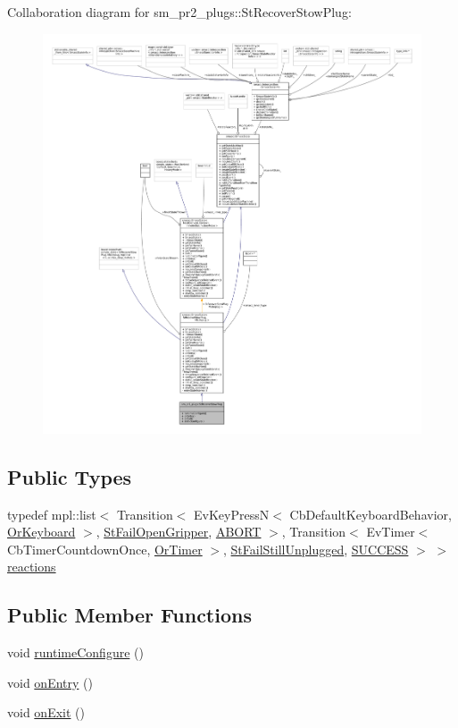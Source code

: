 Collaboration diagram for sm\+\_\+pr2\+\_\+plugs\+:\+:St\+Recover\+Stow\+Plug\+:
\nopagebreak
\begin{figure}[H]
\begin{center}
\leavevmode
\includegraphics[width=350pt]{structsm__pr2__plugs_1_1StRecoverStowPlug__coll__graph}
\end{center}
\end{figure}
\subsection*{Public Types}
\begin{DoxyCompactItemize}
\item 
typedef mpl\+::list$<$ Transition$<$ Ev\+Key\+PressN$<$ Cb\+Default\+Keyboard\+Behavior, \hyperlink{classsm__pr2__plugs_1_1OrKeyboard}{Or\+Keyboard} $>$, \hyperlink{structsm__pr2__plugs_1_1StFailOpenGripper}{St\+Fail\+Open\+Gripper}, \hyperlink{classABORT}{A\+B\+O\+RT} $>$, Transition$<$ Ev\+Timer$<$ Cb\+Timer\+Countdown\+Once, \hyperlink{classsm__pr2__plugs_1_1OrTimer}{Or\+Timer} $>$, \hyperlink{structsm__pr2__plugs_1_1StFailStillUnplugged}{St\+Fail\+Still\+Unplugged}, \hyperlink{classSUCCESS}{S\+U\+C\+C\+E\+SS} $>$ $>$ \hyperlink{structsm__pr2__plugs_1_1StRecoverStowPlug_a44331b5028d908b5a20054cc2ddb1972}{reactions}
\end{DoxyCompactItemize}
\subsection*{Public Member Functions}
\begin{DoxyCompactItemize}
\item 
void \hyperlink{structsm__pr2__plugs_1_1StRecoverStowPlug_a5f2f825961ceda59ed4811aaca86bbcf}{runtime\+Configure} ()
\item 
void \hyperlink{structsm__pr2__plugs_1_1StRecoverStowPlug_a0ce711a64e8d97a987222022ca226a40}{on\+Entry} ()
\item 
void \hyperlink{structsm__pr2__plugs_1_1StRecoverStowPlug_a21347a5da1f792ab0e6977d6426f83ec}{on\+Exit} ()
\end{DoxyCompactItemize}

